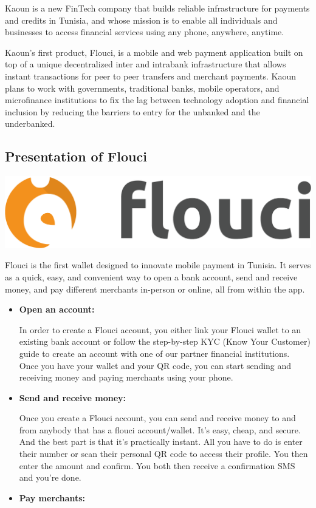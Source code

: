 \begin{spacing}{1.2}
Kaoun is a new FinTech company that builds reliable infrastructure for payments and credits in Tunisia, and whose mission is to enable all individuals and businesses to access financial services using any phone, anywhere, anytime.

Kaoun's first product, Flouci, is a mobile and web payment application built on top of a unique decentralized inter and intrabank infrastructure that allows instant transactions for peer to peer transfers and merchant payments. Kaoun plans to work with governments, traditional banks, mobile operators, and microfinance institutions to fix the lag between technology adoption and financial inclusion by reducing the barriers to entry for the unbanked and the underbanked.








\subsection{Presentation of Flouci}
\begin{center}
	\includegraphics[scale=0.2]{floucilogo.png}
\end{center}
Flouci is the first wallet designed to innovate mobile payment in Tunisia. It serves as a quick, easy, and convenient way to open a bank account, send and receive money, and pay different merchants in-person or online, all from within the app.
\begin{itemize}
  \item \textbf{Open an account:}

  In order to create a Flouci account, you either link your Flouci wallet to an existing bank account or follow the step-by-step KYC (Know Your Customer) guide to create an account with one of our partner financial institutions. Once you have your wallet and your QR code, you can start sending and receiving money and paying merchants using your phone.

  \item \textbf{Send and receive money:}

  Once you create a Flouci account, you can send and receive money to and from anybody that has a flouci account/wallet. It's easy, cheap, and secure. And the best part is that it's practically instant. All you have to do is enter their number or scan their personal QR code to access their profile. You then enter the amount and confirm. You both then receive a confirmation SMS and you're done.
  \item \textbf{Pay merchants:}


\end{itemize}
\end{spacing}
